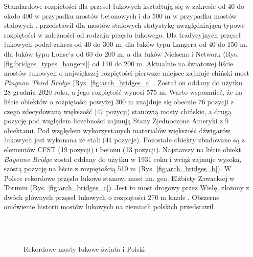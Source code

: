 Standardowe rozpiętości dla przęseł łukowych kształtują się w zakresie od 40 do około 400 w przypadku mostów betonowych i do 500 m w przypadku mostów stalowych \parencite{Madaj2009}. \cite{Czudek1997} przedstawił dla mostów stalowych statystykę uwzględniającą typowe rozpiętości w zależności od rodzaju przęsła łukowego. Dla tradycyjnych przęseł łukowych podał zakres od 40 do 300 m, dla łuków typu Langera od 40 do 150 m, dla łuków typu Lohse'a od 60 do 200 m, a dla łuków Nielsena i Network (Rys. \ref{fig:bridges_types_hangers}) od 110 do 200 m. Aktualnie na światowej liście mostów łukowych o największej rozpiętości pierwsze miejsce zajmuje chiński most \textit{Pingnan Third Bridge} (Rys. \ref{fig:arch_bridges_a} \parencite{Contributors2021,Biliszczuk2015a}. Został on oddany do użytku 28 grudnia 2020 roku, a jego rozpiętość wynosi 575 m. Warto wspomnieć, że na liście obiektów o rozpiętości powyżej 300 m znajduje się obecnie 76 pozycji z czego zdecydowaną większość (47 pozycji) stanowią mosty chińskie, a drugą pozycję pod względem liczebności zajmują Stany Zjednoczone Ameryki z 9 obiektami. Pod względem wykorzystanych materiałów większość dźwigarów łukowych jest wykonana ze stali (44 pozycje). Pozostałe obiekty  zbudowane są z elementów CFST (19 pozycji) i betonu (13 pozycji). Najstarszy na liście obiekt \textit{Bayonne Bridge} został oddany do użytku w 1931 roku i wciąż zajmuje wysoką, szóstą pozycję na liście z rozpiętością 510 m (Rys. \ref{fig:arch_bridges_b}). W Polsce rekordowe przęsło łukowe stanowi most im. gen. Elżbiety Zawackiej w Toruniu (Rys. \ref{fig:arch_bridges_c}). Jest to most drogowy przez Wisłę, złożony z dwóch głównych przęseł łukowych o rozpiętości 270 m każde \parencite{Wachalski2015}. Obszerne omówienie historii mostów łukowych na ziemiach polskich przedstawił \cite{Biliszczuk2015}.
 
\begin{figure}[bt!]
	\centering
	\captionsetup{justification=centering}
	\;
	\\
	 \\

	
	\caption{Rekordowe mosty łukowe świata i Polski}
	\label{fig:arch_bridges}
\end{figure}






